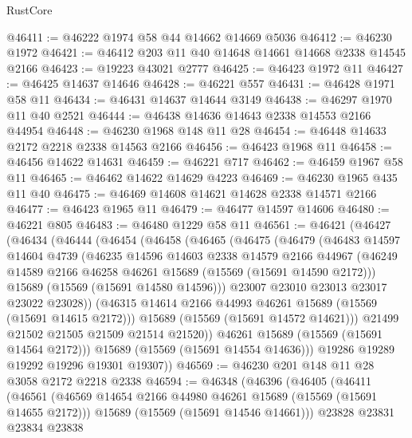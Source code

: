\begin{lexlean}{RustCore}
\begin{coremodule}
@46411 := @46222 @1974 @58 @44 @14662 @14669 @5036
@46412 := @46230 @1972
@46421 := @46412 @203 @11 @40 @14648 @14661 @14668 @2338 @14545 @2166
@46423 := @19223 @43021 @2777
@46425 := @46423 @1972 @11
@46427 := @46425 @14637 @14646
@46428 := @46221 @557
@46431 := @46428 @1971 @58 @11
@46434 := @46431 @14637 @14644 @3149
@46438 := @46297 @1970 @11 @40 @2521
@46444 := @46438 @14636 @14643 @2338 @14553 @2166 @44954
@46448 := @46230 @1968 @148 @11 @28
@46454 := @46448 @14633 @2172 @2218 @2338 @14563 @2166
@46456 := @46423 @1968 @11
@46458 := @46456 @14622 @14631
@46459 := @46221 @717
@46462 := @46459 @1967 @58 @11
@46465 := @46462 @14622 @14629 @4223
@46469 := @46230 @1965 @435 @11 @40
@46475 := @46469 @14608 @14621 @14628 @2338 @14571 @2166
@46477 := @46423 @1965 @11
@46479 := @46477 @14597 @14606
@46480 := @46221 @805
@46483 := @46480 @1229 @58 @11
@46561 := @46421
    (@46427
      (@46434
        (@46444
          (@46454
            (@46458
              (@46465
                (@46475
                  (@46479
                    (@46483
                      @14597
                      @14604
                      @4739
                      (@46235
                        @14596
                        @14603
                        @2338
                        @14579
                        @2166
                        @44967
                        (@46249 @14589 @2166 @46258 @46261 @15689 (@15569 (@15691 @14590 @2172)))
                        @15689
                        (@15569 (@15691 @14580 @14596)))
                      @23007
                      @23010
                      @23013
                      @23017
                      @23022
                      @23028))
                  (@46315 @14614 @2166 @44993 @46261 @15689 (@15569 (@15691 @14615 @2172)))
                  @15689
                  (@15569 (@15691 @14572 @14621)))
                @21499
                @21502
                @21505
                @21509
                @21514
                @21520))
            @46261
            @15689
            (@15569 (@15691 @14564 @2172)))
          @15689
          (@15569 (@15691 @14554 @14636)))
        @19286
        @19289
        @19292
        @19296
        @19301
        @19307))
@46569 := @46230 @201 @148 @11 @28 @3058 @2172 @2218 @2338
@46594 := @46348
    (@46396
      (@46405
        (@46411
          (@46561
            (@46569 @14654 @2166 @44980 @46261 @15689 (@15569 (@15691 @14655 @2172)))
            @15689
            (@15569 (@15691 @14546 @14661)))
          @23828
          @23831
          @23834
          @23838

\end{coremodule}
\end{lexlean}

